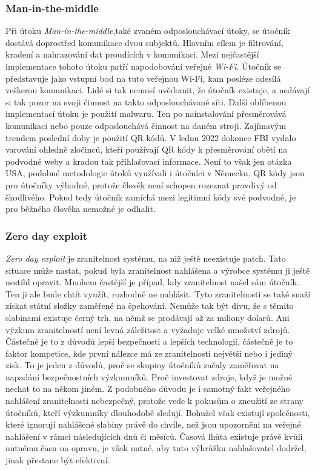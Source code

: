 \subsubsection{Man-in-the-middle}
Při útoku \textit{Man-in-the-middle},také zvaném odposlouchávací útoky, se útočník dostává doprostřed komunikace dvou subjektů.
Hlavním cílem je filtrování, kradení a nahrazování dat proudících v komunikaci.
Mezi nejčastější implementace tohoto útoku patří napodobování veřejné \textit{Wi-Fi}.
Útočník se představuje jako vstupní bod na tuto veřejnou Wi-Fi, kam posléze odesílá veškerou komunikaci.
Lidé si tak nemusí uvědomit, že útočník existuje, a nedávají si tak pozor na svoji činnost na takto odposlouchávané síti.
Další oblíbenou implementací útoku je použití malwaru.
Ten po nainstalování přesměrovává komunikaci nebo pouze odposlouchává činnost na daném stroji.
Zajímavým trendem poslední doby je použití QR kódů.
V lednu 2022 dokonce FBI vydalo varování ohledně zločinců, kteří používají QR kódy k přesměrování obětí na podvodné weby a kradou tak přihlašovací informace.
Není to však jen otázka USA, podobné metodologie útoků využívali i útočníci v Německu.
QR kódy jsou pro útočníky výhodné, protože člověk není schopen rozeznat pravdivý od škodlivého.
Pokud tedy útočník zamíchá mezi legitimní kódy své podvodné, je pro běžného člověka nemožné je odhalit.\cite{Enisa_thread_landscape, cisco_most_common_attack}


\subsubsection{Zero day exploit}
\textit{Zero day exploit} je zranitelnost systému, na niž ještě neexistuje patch.
Tato situace může nastat, pokud byla zranitelnost nahlášena a výrobce systému ji ještě nestihl opravit.
Mnohem častější je případ, kdy zranitelnost našel sám útočník.
Ten ji ale bude chtít využít, rozhodně ne nahlásit.
Tyto zranitelnosti se také snaží získat státní složky zaměřené na špehování.
Nemůže tak být divu, že s těmito slabinami existuje černý trh\cite{world_end_2021}, na němž se prodávají až za miliony dolarů.
Ani výzkum zranitelností není levná záležitost a vyžaduje velké množství zdrojů.
Částečně je to z důvodů lepší bezpečnosti a lepších technologií, částečně je to faktor kompetice, kde první nálezce má ze zranitelnosti největší nebo i jediný zisk.
To je jeden z důvodů, proč se skupiny útočníků začaly zaměřovat na napadání bezpečnostních výzkumníků.
Proč investovat zdroje, když je možné nechat to na někom jiném.
Z podobného důvodu je i samotný fakt veřejného nahlášení zranitelnosti nebezpečný, protože vede k pokusům o zneužití ze strany útočníků, kteří výzkumníky dlouhodobě sledují.
Bohužel však existují společnosti, které ignorují nahlášené slabiny právě do chvíle, než jsou upozorněni na veřejné nahlášení v rámci následujících dnů či měsíců.
Časová lhůta existuje právě kvůli nutnému času na opravu, je však nutné, aby tuto výhrůžku nahlašovatel dodržel, jinak přestane být efektivní.\cite{Enisa_thread_landscape}


